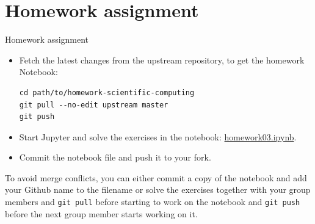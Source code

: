 \section{Homework assignment}


\begin{frame}[fragile]{Homework assignment}
	\begin{itemize}
		\item Fetch the latest changes from the upstream repository, to get the homework Notebook:
            {\scriptsize
            \begin{verbatim}
cd path/to/homework-scientific-computing
git pull --no-edit upstream master
git push\end{verbatim}
            }
        \item Start Jupyter and solve the exercises in the notebook:
            \href{https://github.com/inwe-boku/homework-scientific-computing/blob/master/homework03-python-introduction/homework03.ipynb}{homework03.ipynb}.
        \item Commit the notebook file and push it to your fork.
	\end{itemize}

    \bigskip
    To avoid merge conflicts, you can either commit a copy of the notebook and add your Github name
    to the filename or solve the exercises together with your group members and \verb|git pull|
    before starting to work on the notebook and \verb|git push| before the next group member starts
    working on it.
\end{frame}


